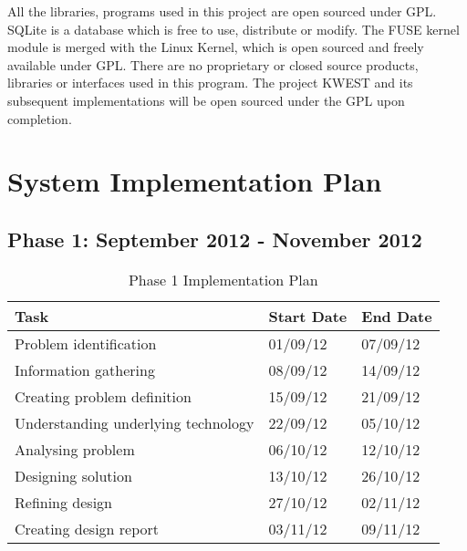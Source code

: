 All the libraries, programs used in this project are open sourced under GPL. SQLite is a
database which is free to use, distribute or modify. The FUSE kernel module is merged
with the Linux Kernel, which is open sourced and freely available under GPL. There
are no proprietary or closed source products, libraries or interfaces used in this program.
The project KWEST and its subsequent implementations will be open sourced under the
GPL upon completion.



\section{System Implementation Plan}

\subsection*{Phase 1: September 2012 - November 2012}
\begin{table}[h]
\begin{tabular}{|p{7cm}|p{2cm}|p{2cm}|}
\hline
\textbf {Task} & \textbf {Start Date} & \textbf{End Date} \\ \hline
Problem identification & 01/09/12 & 07/09/12 \\ \hline
Information gathering & 08/09/12 & 14/09/12 \\ \hline
Creating problem definition & 15/09/12 & 21/09/12 \\ \hline
Understanding underlying technology & 22/09/12 & 05/10/12 \\ \hline
Analysing problem & 06/10/12 & 12/10/12 \\ \hline
Designing solution & 13/10/12 & 26/10/12 \\ \hline
Refining design & 27/10/12 & 02/11/12 \\ \hline
Creating design report & 03/11/12 & 09/11/12 \\
\hline
\end{tabular}
\caption{Phase 1 Implementation Plan}
\label{tab:P1plan}
\end{table}

